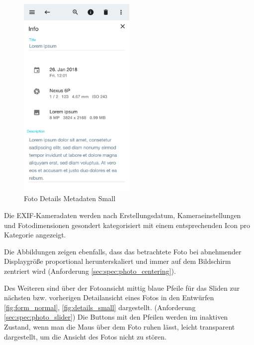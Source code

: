 \begin{figure}[htp]     %
\centering
\includegraphics[width=0.5\textwidth]{images/form_small}
\caption{Foto Details Metadaten Small}\label{fig:form_small}
\end{figure}

Die EXIF-Kameradaten werden nach Erstellungsdatum, Kameraeinstellungen und Fotodimensionen gesondert kategorisiert mit einem entsprechenden Icon pro Kategorie angezeigt.

Die Abbildungen zeigen ebenfalls, dass das betrachtete Foto bei abnehmender Displaygröße proportional herunterskaliert und immer auf dem Bildschirm zentriert wird (Anforderung \ref{sec:spec:photo_centering}).

Des Weiteren sind über der Fotoansicht mittig blaue Pfeile für das Sliden zur nächsten bzw. vorherigen Detailansicht eines Fotos in den Entwürfen \ref{fig:form_normal}, \ref{fig:details_small} dargestellt. (Anforderung \ref{sec:spec:photo_slider}) Die Buttons mit den Pfeilen werden im inaktiven Zustand, wenn man die Maus über dem Foto ruhen lässt, leicht transparent dargestellt, um die Ansicht des Fotos nicht zu stören.
